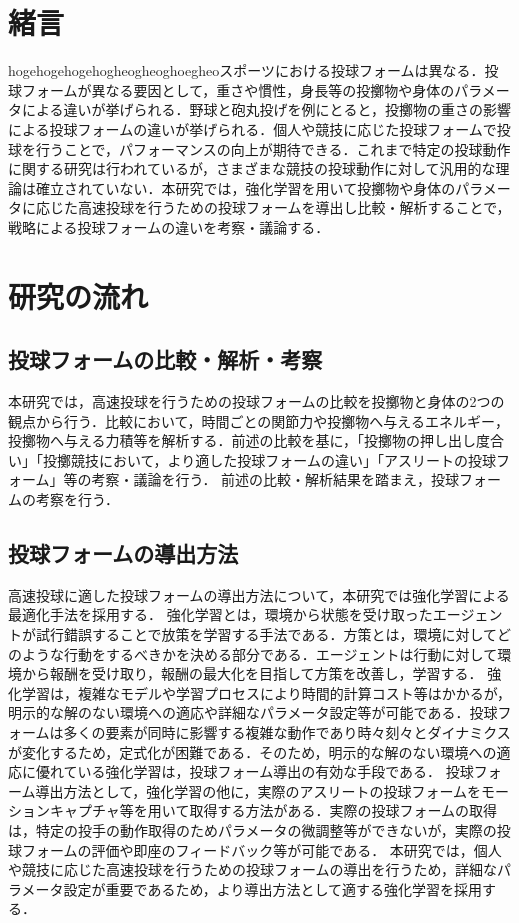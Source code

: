 \begin{small}
\section{緒言}
hogehogehogehogheogheoghoegheoスポーツにおける投球フォームは異なる．投球フォームが異なる要因として，重さや慣性，身長等の投擲物や身体のパラメータによる違いが挙げられる．野球と砲丸投げを例にとると，投擲物の重さの影響による投球フォームの違いが挙げられる．個人や競技に応じた投球フォームで投球を行うことで，パフォーマンスの向上が期待できる．これまで特定の投球動作に関する研究は行われているが，さまざまな競技の投球動作に対して汎用的な理論は確立されていない．本研究では，強化学習を用いて投擲物や身体のパラメータに応じた高速投球を行うための投球フォームを導出し比較・解析することで，戦略による投球フォームの違いを考察・議論する．

\section{研究の流れ}
\subsection{投球フォームの比較・解析・考察}
本研究では，高速投球を行うための投球フォームの比較を投擲物と身体の2つの観点から行う．比較において，時間ごとの関節力や投擲物へ与えるエネルギー，投擲物へ与える力積等を解析する．前述の比較を基に，「投擲物の押し出し度合い」「投擲競技において，より適した投球フォームの違い」「アスリートの投球フォーム」等の考察・議論を行う．
前述の比較・解析結果を踏まえ，投球フォームの考察を行う．
\subsection{投球フォームの導出方法}
高速投球に適した投球フォームの導出方法について，本研究では強化学習による最適化手法を採用する．
強化学習とは，環境から状態を受け取ったエージェントが試行錯誤することで放策を学習する手法である．方策とは，環境に対してどのような行動をするべきかを決める部分である．エージェントは行動に対して環境から報酬を受け取り，報酬の最大化を目指して方策を改善し，学習する．
強化学習は，複雑なモデルや学習プロセスにより時間的計算コスト等はかかるが，明示的な解のない環境への適応や詳細なパラメータ設定等が可能である．投球フォームは多くの要素が同時に影響する複雑な動作であり時々刻々とダイナミクスが変化するため，定式化が困難である．そのため，明示的な解のない環境への適応に優れている強化学習は，投球フォーム導出の有効な手段である．
投球フォーム導出方法として，強化学習の他に，実際のアスリートの投球フォームをモーションキャプチャ等を用いて取得する方法がある．実際の投球フォームの取得は，特定の投手の動作取得のためパラメータの微調整等ができないが，実際の投球フォームの評価や即座のフィードバック等が可能である．
本研究では，個人や競技に応じた高速投球を行うための投球フォームの導出を行うため，詳細なパラメータ設定が重要であるため，より導出方法として適する強化学習を採用する．


\end{small}
